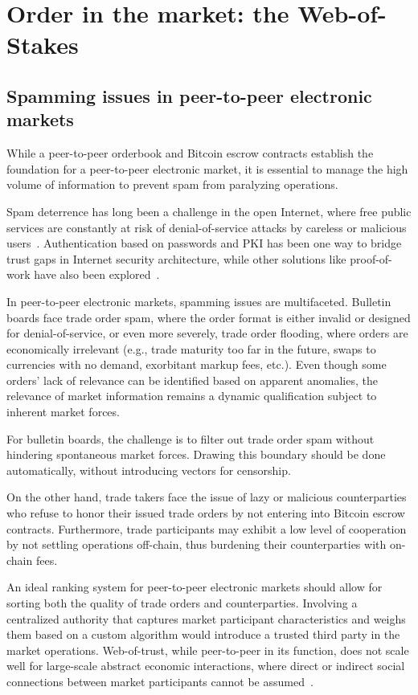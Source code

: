 \documentclass[pdflatex,sn-mathphys]{sn-jnl}%
\theoremstyle{thmstyleone}%
\theoremstyle{thmstyletwo}%
\theoremstyle{thmstylethree}%
\begin{document}
\section{Order in the market: the Web-of-Stakes}

\subsection{Spamming issues in peer-to-peer electronic markets}

While a peer-to-peer orderbook and Bitcoin escrow contracts establish the foundation for a peer-to-peer electronic market, it is essential to manage the high volume of information to prevent spam from paralyzing operations.

Spam deterrence has long been a challenge in the open Internet, where free public services are constantly at risk of denial-of-service attacks by careless or malicious users~\cite{Junk1975Postel}. Authentication based on passwords and PKI has been one way to bridge trust gaps in Internet security architecture, while other solutions like proof-of-work have also been explored~\cite{Hashcash2002Back}. 

In peer-to-peer electronic markets, spamming issues are multifaceted. Bulletin boards face trade order spam, where the order format is either invalid or designed for denial-of-service, or even more severely, trade order flooding, where orders are economically irrelevant (e.g., trade maturity too far in the future, swaps to currencies with no demand, exorbitant markup fees, etc.). Even though some orders' lack of relevance can be identified based on apparent anomalies, the relevance of market information remains a dynamic qualification subject to inherent market forces.

For bulletin boards, the challenge is to filter out trade order spam without hindering spontaneous market forces. Drawing this boundary should be done automatically, without introducing vectors for censorship.

On the other hand, trade takers face the issue of lazy or malicious counterparties who refuse to honor their issued trade orders by not entering into Bitcoin escrow contracts. Furthermore, trade participants may exhibit a low level of cooperation by not settling operations off-chain, thus burdening their counterparties with on-chain fees.

An ideal ranking system for peer-to-peer electronic markets should allow for sorting both the quality of trade orders and counterparties. Involving a centralized authority that captures market participant characteristics and weighs them based on a custom algorithm would introduce a trusted third party in the market operations. Web-of-trust, while peer-to-peer in its function, does not scale well for large-scale abstract economic interactions, where direct or indirect social connections between market participants cannot be assumed~\cite{WOT2023Wikipedia}.
\end{document}
